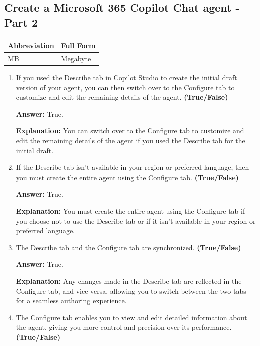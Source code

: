 \documentclass[10pt]{article}
\begin{document}
\subsection{Create a Microsoft 365 Copilot Chat agent - Part 2}

\begin{center}
\begin{tabular}{>{\raggedright\arraybackslash}p{} >{\raggedright\arraybackslash}p{}}
\toprule
\textbf{Abbreviation} & \textbf{Full Form} \\
\midrule
MB & Megabyte \\
\bottomrule
\end{tabular}
\end{center}

\begin{enumerate}[leftmargin=*]

\item If you used the Describe tab in Copilot Studio to create the initial draft version of your agent, you can then switch over to the Configure tab to customize and edit the remaining details of the agent. \textbf{(True/False)}

\textbf{Answer:} True.

\textbf{Explanation:} You can switch over to the Configure tab to customize and edit the remaining details of the agent if you used the Describe tab for the initial draft.

\item If the Describe tab isn’t available in your region or preferred language, then you must create the entire agent using the Configure tab. \textbf{(True/False)}

\textbf{Answer:} True.

\textbf{Explanation:} You must create the entire agent using the Configure tab if you choose not to use the Describe tab or if it isn’t available in your region or preferred language.

\item The Describe tab and the Configure tab are synchronized. \textbf{(True/False)}

\textbf{Answer:} True.

\textbf{Explanation:} Any changes made in the Describe tab are reflected in the Configure tab, and vice-versa, allowing you to switch between the two tabs for a seamless authoring experience.

\item The Configure tab enables you to view and edit detailed information about the agent, giving you more control and precision over its performance. \textbf{(True/False)}


\end{enumerate}
\end{document}

